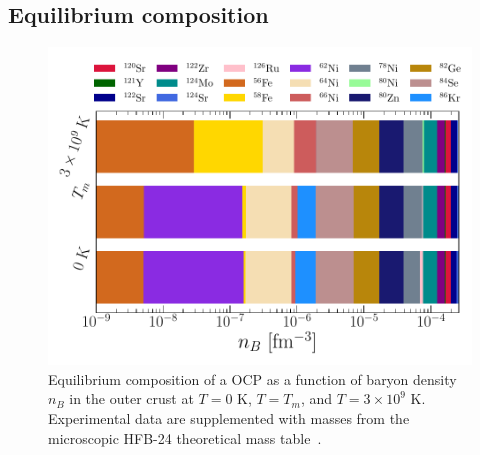 \subsection{Equilibrium composition}\label{subsec:compo_ocrust_tm}

\begin{figure}[!t]
  \begin{center}
    \includegraphics[width=\linewidth]{figures/ocrust_compo_vs_temp.pdf}
  \end{center}
  \caption[Equilibrium OCP composition versus baryon density in the outer crust 
  at finite temperature]{Equilibrium composition of a OCP as a function of 
    baryon density $n_B$ in the outer crust at $T=0$ K, $T=T_m$, and 
    $T=3\times 10^9$ K. 
  Experimental data are supplemented with masses from the microscopic HFB-24 
  theoretical mass table~\cite{Goriely2013}.}\label{fig:ocrust_compo_vs_temp}
\end{figure}

